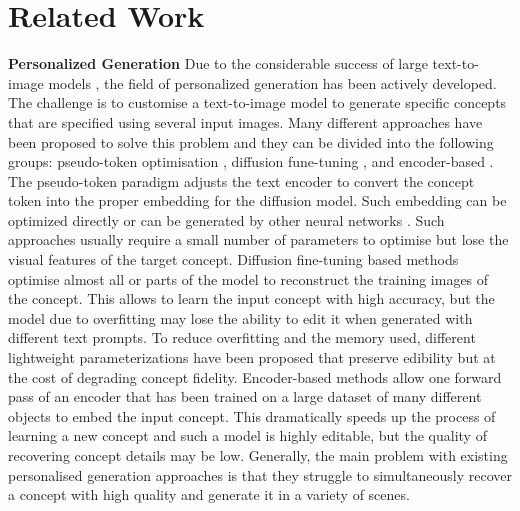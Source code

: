 \section{Related Work} \label{sec:related_work}
\textbf{Personalized Generation} 
Due to the considerable success of large text-to-image models \cite{ramesh2022hierarchical, ramesh2021zero, saharia2022photorealistic, rombach2022high}, the field of personalized generation has been actively developed. The challenge is to customise a text-to-image model to generate specific concepts that are specified using several input images. Many different approaches \cite{DB, TI, CD, svdiff, ortogonal, profusion, elite, r1e} have been proposed to solve this problem and they can be divided into the following groups: pseudo-token optimisation \cite{TI, profusion, disenbooth, r1e}, diffusion fune-tuning \cite{DB, CD, profusion}, and encoder-based \cite{elite}. The pseudo-token paradigm adjusts the text encoder to convert the concept token into the proper embedding for the diffusion model. Such embedding can be optimized directly \cite{TI, r1e} or can be generated by other neural networks \cite{disenbooth, profusion}. Such approaches usually require a small number of parameters to optimise but lose the visual features of the target concept. Diffusion fine-tuning based methods optimise almost all \cite{DB} or parts \cite{CD} of the model to reconstruct the training images of the concept. This allows to learn the input concept with high accuracy, but the model due to overfitting may lose the ability to edit it when generated with different text prompts. To reduce overfitting and the memory used, different lightweight parameterizations \cite{svdiff, r1e, lora} have been proposed that preserve edibility but at the cost of degrading concept fidelity. Encoder-based methods \cite{elite} allow one forward pass of an encoder that has been trained on a large dataset of many different objects to embed the input concept. This dramatically speeds up the process of learning a new concept and such a model is highly editable, but the quality of recovering concept details may be low. Generally, the main problem with existing personalised generation approaches is that they struggle to simultaneously recover a concept with high quality and generate it in a variety of scenes.

